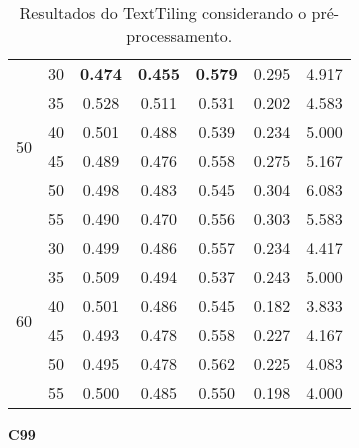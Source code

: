 \documentclass{article}
\begin{document}
\begin{table}[!h]
\begin{tabular}{|c|c|c|c|c|c|c|}
 \multirow{6}{*}{50} 
  & 30 & \cellcolor{gray!20} \textbf{0.474} & \cellcolor{gray!20} \textbf{0.455} & \cellcolor{gray!20} \textbf{0.579} & 0.295 & 4.917  \\ \cline{2-7}
  & 35 & 0.528 & 0.511 & 0.531 & 0.202 & 4.583  \\ \cline{2-7}
  & 40 & 0.501 & 0.488 & 0.539 & 0.234 & 5.000  \\ \cline{2-7}
  & 45 & 0.489 & 0.476 & 0.558 & 0.275 & 5.167  \\ \cline{2-7}
  & 50 & 0.498 & 0.483 & 0.545 & 0.304 & 6.083  \\ \cline{2-7}
  & 55 & 0.490 & 0.470 & 0.556 & 0.303 & 5.583  \\  \hline 
 \multirow{6}{*}{60} 
  & 30 & 0.499 & 0.486 & 0.557 & 0.234 & 4.417  \\ \cline{2-7}
  & 35 & 0.509 & 0.494 & 0.537 & 0.243 & 5.000  \\ \cline{2-7}
  & 40 & 0.501 & 0.486 & 0.545 & 0.182 & 3.833  \\ \cline{2-7}
  & 45 & 0.493 & 0.478 & 0.558 & 0.227 & 4.167  \\ \cline{2-7}
  & 50 & 0.495 & 0.478 & 0.562 & 0.225 & 4.083  \\ \cline{2-7}
  & 55 & 0.500 & 0.485 & 0.550 & 0.198 & 4.000  \\  \hline 

 \end{tabular}  
\caption{Resultados do TextTiling considerando o pré-processamento.}
\end{table} 

 \newpage



{  
\large
\center
	\textbf{C99}  

}
\end{document}
